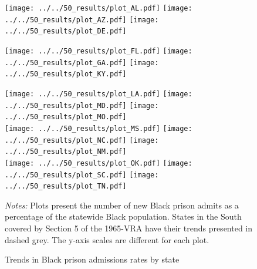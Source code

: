 \documentclass[12pt]{article}
\begin{document}
\begin{figure}[h!]
 	\begin{center}
 	\caption{Trends in Black prison admissions rates by state}
 	\small

 		\vspace{.2in}
      \texttt{[image: ../../50\_results/plot\_AL.pdf]}
 			\texttt{[image: ../../50\_results/plot\_AZ.pdf]}
       \texttt{[image: ../../50\_results/plot\_DE.pdf]}\\

       \vspace{.05in}

 			\texttt{[image: ../../50\_results/plot\_FL.pdf]}
       \texttt{[image: ../../50\_results/plot\_GA.pdf]}
       \texttt{[image: ../../50\_results/plot\_KY.pdf]}\\

       \vspace{.05in}

 			\texttt{[image: ../../50\_results/plot\_LA.pdf]}
 			\texttt{[image: ../../50\_results/plot\_MD.pdf]}
 			\texttt{[image: ../../50\_results/plot\_MO.pdf]} \\

       \vspace{.05in}
       \texttt{[image: ../../50\_results/plot\_MS.pdf]}
       \texttt{[image: ../../50\_results/plot\_NC.pdf]}
       \texttt{[image: ../../50\_results/plot\_NM.pdf]} \\

       \vspace{.05in}
       \texttt{[image: ../../50\_results/plot\_OK.pdf]}
 			\texttt{[image: ../../50\_results/plot\_SC.pdf]}
 			\texttt{[image: ../../50\_results/plot\_TN.pdf]}\\
 	\label{figure_states1}
 	\end{center}
   {\scriptsize{\emph{Notes:} Plots present the number of new Black prison admits as a percentage of the statewide Black population.  States in the South covered by Section 5 of the 1965-VRA have their trends presented in dashed grey. The y-axis scales are different for each plot.}}
 \end{figure} \normalsize
\end{document}
